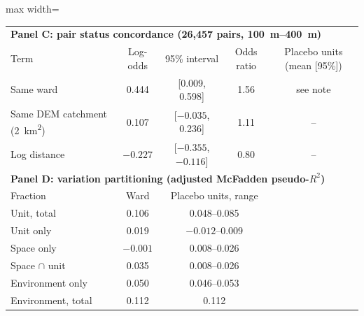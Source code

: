 \documentclass[preprint,12pt,authoryear]{elsarticle}
\begin{document}
\begin{table}[!htbp]
\begin{adjustbox}{max width=\linewidth}
\begin{tabular}{lcccccc}
    \midrule
    \multicolumn{7}{l}{\textbf{Panel C: pair status concordance (26,457 pairs, \SIrange{100}{400}{\metre})}} \\
    Term & \multicolumn{2}{c}{Log-odds} & \multicolumn{2}{c}{95\% interval} & Odds ratio & Placebo units (mean [95\%]) \\
    \midrule
    Same ward & \multicolumn{2}{c}{0.444} & \multicolumn{2}{c}{[0.009, 0.598]} & 1.56 & see note \\
    Same DEM catchment (\SI{2}{\kilo\metre\squared}) & \multicolumn{2}{c}{0.107} & \multicolumn{2}{c}{[$-0.035$, 0.236]} & 1.11 & -- \\
    Log distance & \multicolumn{2}{c}{$-0.227$} & \multicolumn{2}{c}{[$-0.355$, $-0.116$]} & 0.80 & -- \\
    \midrule
    \multicolumn{7}{l}{\textbf{Panel D: variation partitioning (adjusted McFadden pseudo-$R^2$)}} \\
    Fraction & \multicolumn{2}{c}{Ward} & \multicolumn{3}{c}{Placebo units, range} & \\
    \midrule
    Unit, total & \multicolumn{2}{c}{0.106} & \multicolumn{3}{c}{0.048--0.085} & \\
    Unit only & \multicolumn{2}{c}{0.019} & \multicolumn{3}{c}{$-0.012$--0.009} & \\
    Space only & \multicolumn{2}{c}{$-0.001$} & \multicolumn{3}{c}{0.008--0.026} & \\
    Space $\cap$ unit & \multicolumn{2}{c}{0.035} & \multicolumn{3}{c}{0.008--0.026} & \\
    Environment only & \multicolumn{2}{c}{0.050} & \multicolumn{3}{c}{0.046--0.053} & \\
    Environment, total & \multicolumn{2}{c}{0.112} & \multicolumn{3}{c}{0.112} & \\
    \bottomrule
  \end{tabular}
  \end{adjustbox}

\end{table}
\end{document}
